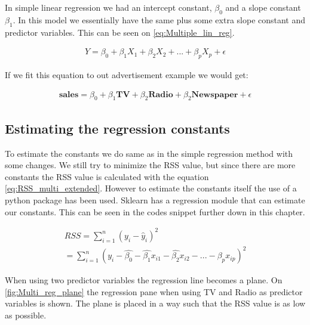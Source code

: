 In simple linear regression we had an intercept constant, $\beta_0$ and a slope constant $\beta_1$. In this model we essentially have the same plus some extra slope constant and predictor variables. This can be seen on \cref{eq:Multiple_lin_reg}.



\begin{equation} \label{eq:Multiple_lin_reg}
\begin{split}
Y = \beta_0 + \beta_1 X_{1} + \beta_2 X_{2}+...+\beta_{p}X_{p}+\epsilon
\end{split}
\end{equation}

If we fit this equation to out advertisement example we would get:

\begin{equation} \label{eq:RSS_multi}
\begin{split}
\textbf{sales} = \beta_0 + \beta_1 \textbf{TV} + \beta_2 \textbf{Radio}+\beta_2 \textbf{Newspaper}+\epsilon
\end{split}
\end{equation}

\subsection{Estimating the regression constants}
To estimate the constants we do same as in the simple regression method with some changes. We still try to minimize the RSS value, but since there are more constants the RSS value is calculated with the equation \cref{eq:RSS_multi_extended}. However to estimate the constants itself the use of a python package has been used. Sklearn has a regression module that can estimate our constants. This can be seen in the codes snippet further down in this chapter.

\begin{equation} \label{eq:RSS_multi_extended}
\begin{split}
 RSS = \sum_{i=1}^{n}(y_{i}-\hat{y}_{i})^{2} \\
	= \sum_{i=1}^{n}(y_{i}-\hat{\beta_0}-\hat{\beta_1}x_{i1}-\hat{\beta_2}x_{i2}-...-\beta_p x_{ip})^{2}
\end{split}
\end{equation}

When using two predictor variables the regression line becomes a plane. On \cref{fig:Multi_reg_plane} the regression pane when using TV and Radio as predictor variables is shown. The plane is placed in a way such that the RSS value is as low as possible. 

